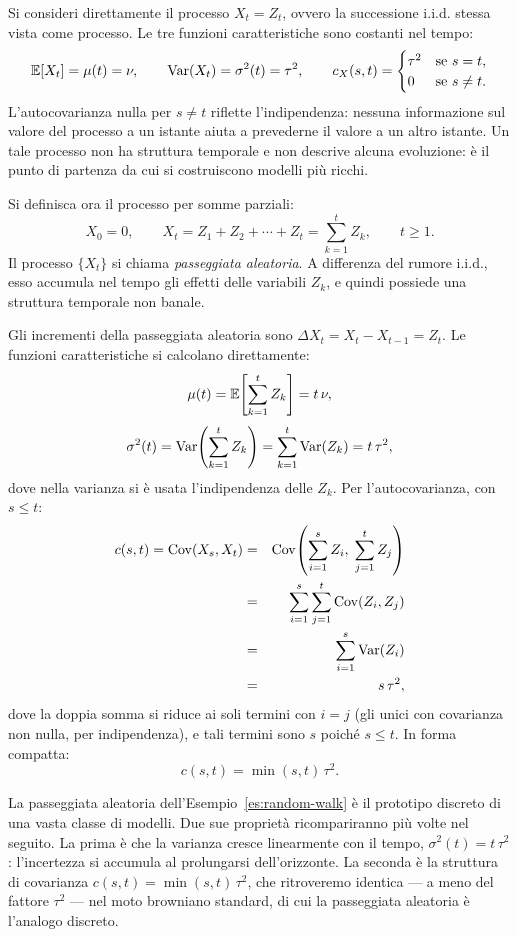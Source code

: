 \begin{example}[Rumore i.i.d.]
\label{es:iid}
Si consideri direttamente il processo $X_t=Z_t$, ovvero la
successione i.i.d. stessa vista come processo. Le tre funzioni
caratteristiche sono costanti nel tempo:
\[
\mathbb{E}[X_t]=\mu(t)=\nu, \qquad \operatorname{Var}(X_t)=\sigma^2(t)=\tau^2, \qquad
c_X(s,t)=\begin{cases}
\tau^2 & \text{se }s=t,\\
0 & \text{se }s\neq t.
\end{cases}
\]
L'autocovarianza nulla per $s\neq t$ riflette l'indipendenza: nessuna
informazione sul valore del processo a un istante aiuta a prevederne
il valore a un altro istante. Un tale processo non ha struttura
temporale e non descrive alcuna evoluzione: \`{e} il punto di partenza
da cui si costruiscono modelli pi\`{u} ricchi.
\end{example}

\begin{example}
\label{es:random-walk}
Si definisca ora il processo per somme parziali:
\[
X_0=0, \qquad X_t=Z_1+Z_2+\cdots+Z_t=\sum_{k=1}^{t}Z_k,
\qquad t\geq 1.
\]
Il processo $\{X_t\}$ si chiama \emph{passeggiata aleatoria}. A
differenza del rumore i.i.d., esso accumula nel tempo gli effetti
delle variabili $Z_k$, e quindi possiede una struttura temporale
non banale.

Gli incrementi della passeggiata aleatoria sono $\Delta X_t=X_t-
X_{t-1}=Z_t$. Le funzioni caratteristiche si calcolano direttamente:
\[
\mu(t)=\mathbb{E}\!\left[\sum_{k=1}^{t}Z_k\right]=t\,\nu,
\]
\[
\sigma^2(t)=\operatorname{Var}\!\left(\sum_{k=1}^{t}Z_k\right)
=\sum_{k=1}^{t}\operatorname{Var}(Z_k)=t\,\tau^2,
\]
dove nella varianza si \`{e} usata l'indipendenza delle $Z_k$. Per
l'autocovarianza, con $s\leq t$:
\begin{eqnarray*}
c(s,t)=\operatorname{Cov}(X_s,X_t)
&=& \operatorname{Cov}\!\left(\sum_{i=1}^{s}Z_i,\;\sum_{j=1}^{t}Z_j\right)\\
&=& \sum_{i=1}^{s}\sum_{j=1}^{t}\operatorname{Cov}(Z_i,Z_j)\\
&=& \sum_{i=1}^{s}\operatorname{Var}(Z_i)\\
&=& s\,\tau^2,
\end{eqnarray*}
dove la doppia somma si riduce ai soli termini con $i=j$ (gli unici
con covarianza non nulla, per indipendenza), e tali termini sono
$s$ poich\'{e} $s\leq t$. In forma compatta:
\[
c(s,t)=\min(s,t)\,\tau^2.
\]
\end{example}

La passeggiata aleatoria dell'Esempio~\ref{es:random-walk} \`{e} il
prototipo discreto di una vasta classe di modelli. Due sue
propriet\`{a} ricompariranno pi\`{u} volte nel seguito. La prima \`{e}
che la varianza cresce linearmente con il tempo, $\sigma^2(t)=t\,
\tau^2$: l'incertezza si accumula al prolungarsi dell'orizzonte. La
seconda \`{e} la struttura di covarianza $c(s,t)=\min(s,t)\,\tau^2$,
che ritroveremo identica --- a meno del fattore $\tau^2$ --- nel moto
browniano standard, di cui la passeggiata aleatoria \`{e} l'analogo
discreto.

